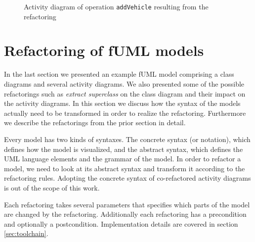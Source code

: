 \documentclass{llncs}
\begin{document}
\begin{figure}[h!t]
 \centering
 \caption{Activity diagram of operation \texttt{addVehicle} resulting from the refactoring}
 \label{fig:addCarRef}
\end{figure}

\clearpage
\section{Refactoring of fUML models}
\label{sec:fuml-refactoring}

In the last section we presented an example fUML model comprising a class diagrams and several activity diagrams. We also presented some 
of the possible refactorings such as \textit{extract superclass} on the class diagram and their impact on the activity diagrams. In this 
section we discuss how the syntax of the models actually need to be transformed in order to realize the refactoring. Furthermore we 
describe the refactorings from the prior section in detail.

Every model has two kinds of syntaxes. The concrete syntax (or notation), which defines how the model is visualized, and the abstract
syntax, which defines the UML language elements and the grammar of the model. In order to refactor a model, we need to look 
at its abstract syntax and transform it according to the refactoring rules. Adopting the concrete syntax of co-refactored activity 
diagrams is out of the scope of this work.

Each refactoring takes several parameters that specifies which parts of the model are changed by the refactoring. Additionally each 
refactoring has a precondition and optionally a postcondition. Implementation details are covered in section \ref{sec:toolchain}.
\end{document}
